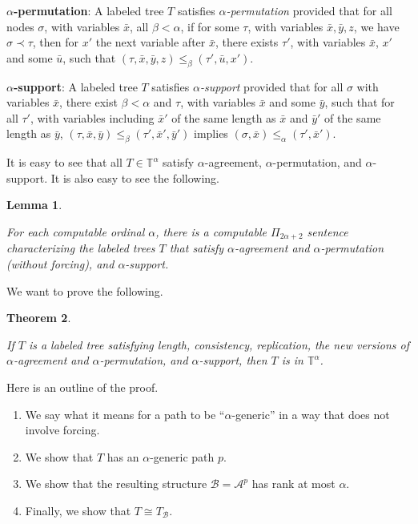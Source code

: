 \documentclass{article}
\newtheorem{thm}{Theorem}[section]
\newtheorem{lem}[thm]{Lemma}
\begin{document}
\bigskip
\noindent
\textbf{$\alpha$-permutation}:  A labeled tree $T$ satisfies \emph{$\alpha$-permutation} provided that for all nodes $\sigma$, with variables $\bar{x}$, all $\beta < \alpha$, if for some $\tau$, with variables $\bar{x},\bar{y},z$, we have $\sigma\prec\tau$, then for $x'$ the next variable after $\bar{x}$, there exists $\tau'$, with variables $\bar{x}$, $x'$ and some $\bar{u}$, such that $(\tau,\bar{x},\bar{y},z)\leq_\beta(\tau',\bar{u},x')$.    

\bigskip
\noindent
\textbf{$\alpha$-support}:  A labeled tree $T$ satisfies \emph{$\alpha$-support} provided that for all $\sigma$ with variables $\bar{x}$, there exist $\beta < \alpha$ and $\tau$, with variables $\bar{x}$ and some $\bar{y}$, such that for all $\tau'$, with variables including $\bar{x}'$ of the same length as $\bar{x}$ and $\bar{y}'$ of the same length as $\bar{y}$, $(\tau,\bar{x},\bar{y})\leq_\beta(\tau',\bar{x}',\bar{y}')$ implies $(\sigma,\bar{x})\leq_\alpha(\tau',\bar{x}')$.   

\bigskip

It is easy to see that all $T\in \mathbb{T}^\alpha$ satisfy $\alpha$-agreement, $\alpha$-permutation, and $\alpha$-support.  It is also easy to see the following.  

\begin{lem}
\label{lem20}

For each computable ordinal $\alpha$, there is a computable $\Pi_{2\alpha+2}$ sentence characterizing the labeled trees $T$ that satisfy $\alpha$-agreement and $\alpha$-permutation (without forcing), and $\alpha$-support.   

\end{lem}

We want to prove the following.  

\begin{thm}
\label{thm21}

If $T$ is a labeled tree satisfying length, consistency, replication, the new versions of $\alpha$-agreement and $\alpha$-permutation, and $\alpha$-support, then $T$ is in $\mathbb{T}^\alpha$.   

\end{thm}

Here is an outline of the proof. 

\begin{enumerate}

\item  We say what it means for a path to be ``$\alpha$-generic'' in a way that does not involve forcing.  

\item  We show that $T$ has an $\alpha$-generic path $p$.

\item  We show that the resulting structure $\mathcal{B} = \mathcal{A}^p$ has rank at most $\alpha$.  

\item  Finally, we show that $T\cong T_\mathcal{B}$.   

\end{enumerate} 
\end{document}
